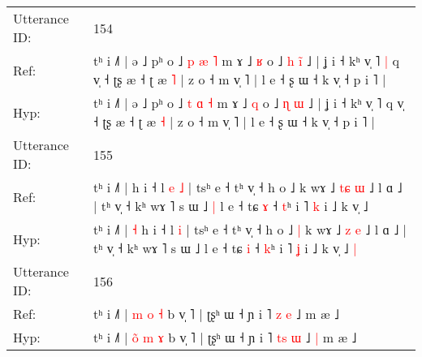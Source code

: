 \documentclass[10pt]{article}
\DeclareRobustCommand{\hl}[1]{{\textcolor{red}{#1}}}
\begin{document}
\begin{longtable}{ll}
 \\
\midrule
Utterance ID: & 154 \\
Ref: & tʰ i ˩˥ | ə ˩ pʰ o ˩ \hl{p} \hl{æ} \hl{˥} m ɤ ˩ \hl{ʁ} o ˩ \hl{h} \hl{i}\hl{̃} ˩ | ʝ i ˧ kʰ v̩ ˥\hl{ }\hl{|} q v̩ ˧ ʈʂ æ ˧ ʈ æ \hl{˥} | z o ˧ m v̩ ˥ | l e ˧ ʂ ɯ ˧ k v̩ ˧ p i ˥ |
 \\
Hyp: & tʰ i ˩˥ | ə ˩ pʰ o ˩ \hl{t} \hl{ɑ} \hl{˧} m ɤ ˩ \hl{q} o ˩ \hl{ɳ} \hl{}\hl{ɯ} ˩ | ʝ i ˧ kʰ v̩ ˥\hl{}\hl{} q v̩ ˧ ʈʂ æ ˧ ʈ æ \hl{˧} | z o ˧ m v̩ ˥ | l e ˧ ʂ ɯ ˧ k v̩ ˧ p i ˥ |
 \\
\midrule
Utterance ID: & 155 \\
Ref: & tʰ i ˩˥ |\hl{}\hl{} h i ˧ l\hl{ }\hl{e} \hl{˩} | tsʰ e ˧ tʰ v̩ ˧ h o ˩\hl{}\hl{} k wɤ ˩ \hl{t}\hl{ɕ} \hl{ɯ} ˩ l ɑ ˩ | tʰ v̩ ˧ kʰ wɤ ˥ s ɯ ˩\hl{ }\hl{|} l e ˧ tɕ \hl{ɤ} ˧ \hl{t}ʰ i ˥ \hl{k} i ˩ k v̩ ˩\hl{}\hl{}
 \\
Hyp: & tʰ i ˩˥ |\hl{ }\hl{˧} h i ˧ l\hl{}\hl{} \hl{i} | tsʰ e ˧ tʰ v̩ ˧ h o ˩\hl{ }\hl{|} k wɤ ˩ \hl{}\hl{z} \hl{e} ˩ l ɑ ˩ | tʰ v̩ ˧ kʰ wɤ ˥ s ɯ ˩\hl{}\hl{} l e ˧ tɕ \hl{i} ˧ \hl{k}ʰ i ˥ \hl{ʝ} i ˩ k v̩ ˩\hl{ }\hl{|}
 \\
\midrule
Utterance ID: & 156 \\
Ref: & tʰ i ˩˥ | \hl{}\hl{m} \hl{o} \hl{˧} b v̩ ˥ | ʈʂʰ ɯ ˧ ɲ i ˥ \hl{}\hl{z} \hl{e} ˩\hl{}\hl{} m æ ˩
 \\
Hyp: & tʰ i ˩˥ | \hl{o}\hl{̃} \hl{m} \hl{ɤ} b v̩ ˥ | ʈʂʰ ɯ ˧ ɲ i ˥ \hl{t}\hl{s} \hl{ɯ} ˩\hl{ }\hl{|} m æ ˩
 \\
\midrule
\end{longtable}
\end{document}
